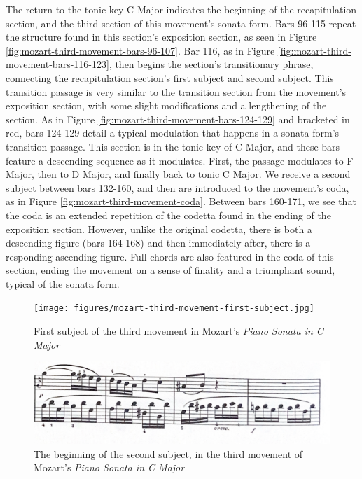The return to the tonic key C Major indicates the beginning of the recapitulation section, and the third section of this movement's sonata form. Bars 96-115 repeat the structure found in this section's exposition section, as seen in Figure \ref{fig:mozart-third-movement-bars-96-107}\autocite{Henle_1977}. Bar 116, as in Figure \ref{fig:mozart-third-movement-bars-116-123}\autocite{Henle_1977}, then begins the section's transitionary phrase, connecting the recapitulation section's first subject and second subject. This transition passage is very similar to the transition section from the movement's exposition section, with some slight modifications and a lengthening of the section. As in Figure \ref{fig:mozart-third-movement-bars-124-129}\autocite{Henle_1977} and bracketed in red, bars 124-129 detail a typical modulation that happens in a sonata form's transition passage. This section is in the tonic key of C Major, and these bars feature a descending sequence as it modulates. First, the passage modulates to F Major, then to D Major, and finally back to tonic C Major. We receive a second subject between bars 132-160, and then are introduced to the movement's coda, as in Figure \ref{fig:mozart-third-movement-coda}\autocite{Henle_1977}. Between bars 160-171, we see that the coda is an extended repetition of the codetta found in the ending of the exposition section. However, unlike the original codetta, there is both a descending figure (bars 164-168) and then immediately after, there is a responding ascending figure. Full chords are also featured in the coda of this section, ending the movement on a sense of finality and a triumphant sound, typical of the sonata form.

\begin{figure}
	\centering
	\texttt{[image: figures/mozart-third-movement-first-subject.jpg]}
	\caption{First subject of the third movement in Mozart's \textit{Piano Sonata in C Major}}
	\label{fig:mozart-third-movement-first-subject}
\end{figure}

\begin{figure}
	\centering
	\includegraphics[width=\textwidth]{figures/mozart-third-movement-beginning-of-second-subject-exposition.jpg}
	\caption[Subject number two, in the third movement of Mozart's \textit{Piano Sonata in C Major}]{The beginning of the second subject, in the third movement of Mozart's \textit{Piano Sonata in C Major}}
	\label{fig:mozart-third-movement-beginning-of-second-subject-exposition}
\end{figure}



